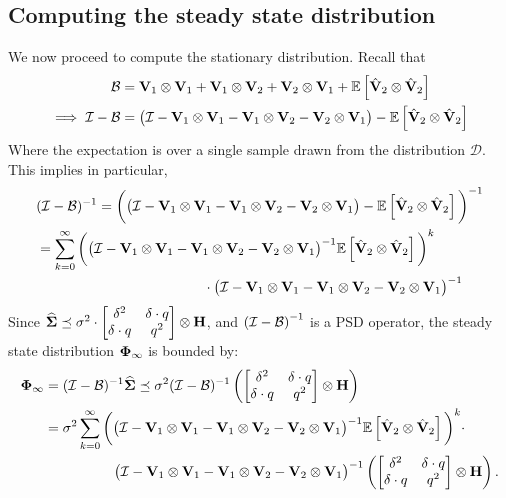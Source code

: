 \subsection{Computing the steady state distribution}

We now proceed to compute the stationary distribution.
Recall that
\begin{align*}
\mathcal{B} &= \mathbf{V}_1\otimes\mathbf{V}_1 + \mathbf{V}_1\otimes\mathbf{V}_2 + \mathbf{V}_2\otimes\mathbf{V}_1 + \mathbb{E}\left[\hat{\mathbf{V}}_2\otimes\hat{\mathbf{V}}_2\right]\nonumber\\
\implies \mathcal{I}-\mathcal{B} &= \big(\mathcal{I}-\mathbf{V}_1\otimes\mathbf{V}_1 - \mathbf{V}_1\otimes\mathbf{V}_2 - \mathbf{V}_2\otimes\mathbf{V}_1\big)-\mathbb{E}\left[\hat{\mathbf{V}}_2\otimes\hat{\mathbf{V}}_2\right]
\end{align*}
Where the expectation is over a single sample drawn from the distribution $\mathcal{D}$.
This implies in particular,
\begin{align}
\label{eq:ibinv}
&(\mathcal{I}-\mathcal{B})^{-1}=\bigg(\big(\mathcal{I}-\mathbf{V}_1\otimes\mathbf{V}_1 - \mathbf{V}_1\otimes\mathbf{V}_2 - \mathbf{V}_2\otimes\mathbf{V}_1\big)-\mathbb{E}\left[\hat{\mathbf{V}}_2\otimes\hat{\mathbf{V}}_2\right]\bigg)^{-1}\nonumber\\
&=\sum_{k=0}^{\infty}\bigg(\big(\mathcal{I}-\mathbf{V}_1\otimes\mathbf{V}_1 - \mathbf{V}_1\otimes\mathbf{V}_2 - \mathbf{V}_2\otimes\mathbf{V}_1\big)^{-1}\mathbb{E}\left[\hat{\mathbf{V}}_2\otimes\hat{\mathbf{V}}_2\right]\bigg)^k\nonumber\\&\qquad\qquad\qquad\qquad\qquad\qquad\cdot\big(\mathcal{I}-\mathbf{V}_1\otimes\mathbf{V}_1 - \mathbf{V}_1\otimes\mathbf{V}_2 - \mathbf{V}_2\otimes\mathbf{V}_1\big)^{-1}
\end{align}
Since $\widehat{\boldsymbol{\Sigma}} \preceq \sigma^2\cdot\begin{bmatrix}\delta^2&\delta\cdot q\\\delta\cdot q&q^2\end{bmatrix}\otimes\mathbf{H}$, and ${\left(\mathcal{I} - \mathcal{B}\right)}^{-1}$ is a PSD operator, the steady state distribution $\boldsymbol{\Phi}_\infty$ is bounded by:
\begin{align}
\label{eq:phivInftyBound}
\boldsymbol{\Phi}_\infty&=(\mathcal{I}-\mathcal{B})^{-1}\mathbf{\widehat{\Sigma}} \preceq \sigma^2 (\mathcal{I}-\mathcal{B})^{-1} \left(\begin{bmatrix}\delta^2&\delta\cdot q\\\delta\cdot q&q^2\end{bmatrix}\otimes\mathbf{H}\right) \nonumber\\
&=\sigma^2 \sum_{k=0}^{\infty}\bigg(\big(\mathcal{I}-\mathbf{V}_1\otimes\mathbf{V}_1 - \mathbf{V}_1\otimes\mathbf{V}_2 - \mathbf{V}_2\otimes\mathbf{V}_1\big)^{-1}\mathbb{E}\left[\hat{\mathbf{V}}_2\otimes\hat{\mathbf{V}}_2\right]\bigg)^k \cdot \nonumber \\
&\qquad \qquad \quad \big(\mathcal{I}-\mathbf{V}_1\otimes\mathbf{V}_1 - \mathbf{V}_1\otimes\mathbf{V}_2 - \mathbf{V}_2\otimes\mathbf{V}_1\big)^{-1} \left(\begin{bmatrix}\delta^2&\delta\cdot q\\\delta\cdot q&q^2\end{bmatrix}\otimes\mathbf{H}\right).
\end{align}
